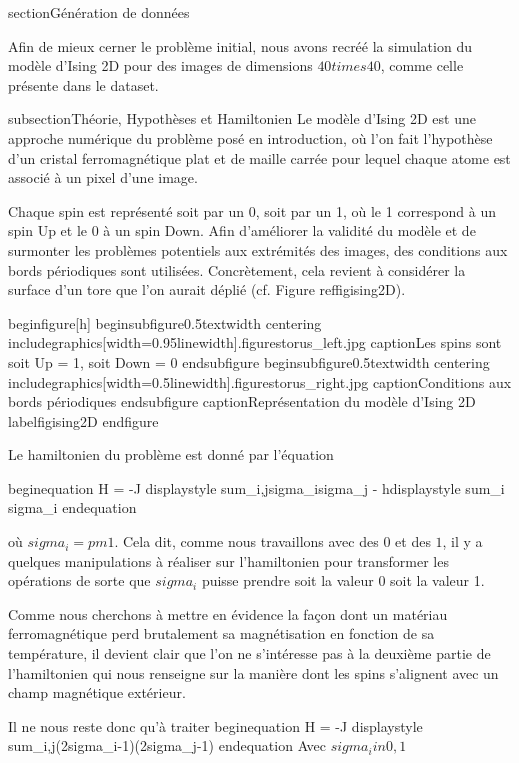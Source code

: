 section{Génération de données}

Afin de mieux cerner le problème initial, nous avons recréé la simulation du modèle d'Ising 2D pour des images de dimensions $40 times 40$, comme celle présente dans le dataset. 

subsection{Théorie, Hypothèses et Hamiltonien}
Le modèle d'Ising 2D est une approche numérique du problème posé en introduction, où l'on fait l'hypothèse d'un cristal ferromagnétique plat et de maille carrée pour lequel chaque atome est associé à un pixel d'une image.

Chaque spin est représenté soit par un 0, soit par un 1, où le 1 correspond à un spin Up et le 0 à un spin Down. Afin d'améliorer la validité du modèle et de surmonter les problèmes potentiels aux extrémités des images, des conditions aux bords périodiques sont utilisées. Concrètement, cela revient à considérer la surface d'un tore que l'on aurait déplié (cf. Figure ref{figising2D}).

begin{figure}[h]
	begin{subfigure}{0.5textwidth}
		centering
		includegraphics[width=0.95linewidth]{.figurestorus_left.jpg}
		caption{Les spins sont soit Up = 1, soit Down = 0}
	end{subfigure}
	begin{subfigure}{0.5textwidth}
		centering
		includegraphics[width=0.5linewidth]{.figurestorus_right.jpg}
		caption{Conditions aux bords périodiques}
	end{subfigure}
	caption{Représentation du modèle d'Ising 2D}
	label{figising2D}
end{figure}


Le hamiltonien du problème est donné par l'équation 


begin{equation}
	H = -J  displaystyle sum_{i,j}sigma_{i}sigma_{j} - hdisplaystyle sum_{i} sigma_{i}
end{equation}

où $sigma_{i} = pm 1$. Cela dit, comme nous travaillons avec des $0$ et des $1$, il y a quelques manipulations à réaliser sur l'hamiltonien pour transformer les opérations de sorte que $sigma_{i}$ puisse prendre soit la valeur 0 soit la valeur 1.

Comme nous cherchons à mettre en évidence la façon dont un matériau ferromagnétique perd brutalement sa magnétisation en fonction de sa température, il devient clair que l'on ne s'intéresse pas à la deuxième partie de l'hamiltonien qui nous renseigne sur la manière dont les spins s'alignent avec un champ magnétique extérieur.

Il ne nous reste donc qu'à traiter 
begin{equation}
	H = -J  displaystyle sum_{i,j}(2sigma_{i}-1)(2sigma_{j}-1)
end{equation}
Avec $sigma_{i} in {0,1}$

